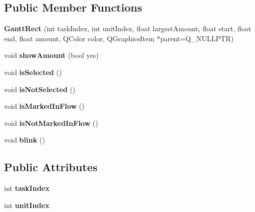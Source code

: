\subsection*{Public Member Functions}
\begin{DoxyCompactItemize}
\item 
\hypertarget{class_gantt_rect_a1796a2b89044eda5d417236b9605e8db}{}{\bfseries Gantt\+Rect} (int task\+Index, int unit\+Index, float largest\+Amount, float start, float end, float amount, Q\+Color color, Q\+Graphics\+Item $\ast$parent=Q\+\_\+\+N\+U\+L\+L\+P\+T\+R)\label{class_gantt_rect_a1796a2b89044eda5d417236b9605e8db}

\item 
\hypertarget{class_gantt_rect_ab56a963d676eaa923430bb940390e017}{}void {\bfseries show\+Amount} (bool yes)\label{class_gantt_rect_ab56a963d676eaa923430bb940390e017}

\item 
\hypertarget{class_gantt_rect_aebb14eb8a807a0e5d560c311c81961c3}{}void {\bfseries is\+Selected} ()\label{class_gantt_rect_aebb14eb8a807a0e5d560c311c81961c3}

\item 
\hypertarget{class_gantt_rect_a1681372c908aaab78c22beaf4146a432}{}void {\bfseries is\+Not\+Selected} ()\label{class_gantt_rect_a1681372c908aaab78c22beaf4146a432}

\item 
\hypertarget{class_gantt_rect_a3d470a764ab8a79c08502d8c92859f88}{}void {\bfseries is\+Marked\+In\+Flow} ()\label{class_gantt_rect_a3d470a764ab8a79c08502d8c92859f88}

\item 
\hypertarget{class_gantt_rect_a769aacba6fa021fe98b8b53f29873851}{}void {\bfseries is\+Not\+Marked\+In\+Flow} ()\label{class_gantt_rect_a769aacba6fa021fe98b8b53f29873851}

\item 
\hypertarget{class_gantt_rect_ac4190e95053e095f83874ba41b0e18a2}{}void {\bfseries blink} ()\label{class_gantt_rect_ac4190e95053e095f83874ba41b0e18a2}

\end{DoxyCompactItemize}
\subsection*{Public Attributes}
\begin{DoxyCompactItemize}
\item 
\hypertarget{class_gantt_rect_a6642ac413af5ade187fac723016f8292}{}int {\bfseries task\+Index}\label{class_gantt_rect_a6642ac413af5ade187fac723016f8292}

\item 
\hypertarget{class_gantt_rect_aad3beda6dc33e7144632705476e2745a}{}int {\bfseries unit\+Index}\label{class_gantt_rect_aad3beda6dc33e7144632705476e2745a}

\end{DoxyCompactItemize}
